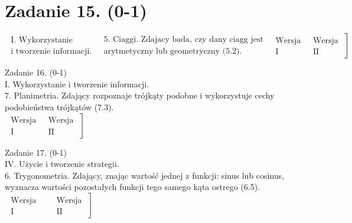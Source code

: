 \documentclass[10pt]{article}
\begin{document}
\section*{Zadanie 15. (0-1)}
$\left.\begin{array}{|l|l|c|c|}\hline \text { I. Wykorzystanie } \\ \text { i tworzenie informacji. }\end{array} \begin{array}{l}\text { 5. Ciaggi. Zdajacy bada, czy dany ciagg jest } \\ \text { arytmetyczny lub geometryczny (5.2). }\end{array} \begin{array}{c}\text { Wersja } \\ \text { I }\end{array} \begin{array}{c}\text { Wersja } \\ \text { II }\end{array}\right]$

Zadanie 16. (0-1)\\
I. Wykorzystanie i tworzenie informacji.\\
7. Planimetria. Zdający rozpoznaje trójkąty podobne i wykorzystuje cechy podobieństwa trójkątów (7.3).\\
$\left.\begin{array}{|c|c|}\hline \text { Wersja } \\ \text { I }\end{array} \begin{array}{c}\text { Wersja } \\ \text { II }\end{array}\right]$

Zadanie 17. (0-1)\\
IV. Użycie i tworzenie strategii.\\
6. Trygonometria. Zdający, znając wartość jednej z funkcji: sinus lub cosinus, wyznacza wartości pozostałych funkcji tego samego kąta ostrego (6.5).\\
$\left.\begin{array}{|c|c|}\hline \text { Wersja } \\ \text { I }\end{array} \quad \begin{array}{c}\text { Wersja } \\ \text { II }\end{array}\right]$
\end{document}
